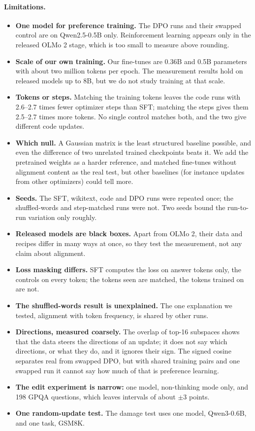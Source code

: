 \paragraph{Limitations.}
\begin{itemize}
  \item \textbf{One model for preference training.} The DPO runs and their
  swapped control are on Qwen2.5-0.5B only. Reinforcement learning appears only
  in the released OLMo 2 stage, which is too small to measure above rounding.
  \item \textbf{Scale of our own training.} Our fine-tunes are 0.36B and 0.5B
  parameters with about two million tokens per epoch. The measurement results
  hold on released models up to 8B, but we do not study training at that scale.
  \item \textbf{Tokens or steps.} Matching the training tokens leaves the
  code runs with 2.6--2.7 times fewer optimizer steps than SFT; matching the steps
  gives them 2.5--2.7 times more tokens. No single control matches both, and the
  two give different code updates.
  \item \textbf{Which null.} A Gaussian matrix is the least structured baseline
  possible, and even the difference of two unrelated trained checkpoints beats
  it. We add the pretrained weights as a harder reference, and matched
  fine-tunes without alignment content as the real test, but other baselines
  (for instance updates from other optimizers) could tell more.
  \item \textbf{Seeds.} The SFT, wikitext, code and DPO runs were repeated
  once; the shuffled-words and step-matched runs were not. Two seeds bound
  the run-to-run variation only roughly.
  \item \textbf{Released models are black boxes.} Apart from OLMo 2, their
  data and recipes differ in many ways at once, so they test the measurement,
  not any claim about alignment.
  \item \textbf{Loss masking differs.} SFT computes the loss on answer tokens
  only, the controls on every token; the tokens seen are matched, the tokens
  trained on are not.
  \item \textbf{The shuffled-words result is unexplained.} The one explanation
  we tested, alignment with token frequency, is shared by other runs.
  \item \textbf{Directions, measured coarsely.} The overlap of top-16
  subspaces shows that the data steers the directions of an update; it does
  not say which directions, or what they do, and it ignores their sign. The
  signed cosine separates real from swapped DPO, but with shared training pairs
  and one swapped run it cannot say how much of that is preference learning.
  \item \textbf{The edit experiment is narrow:} one model, non-thinking mode
  only, and 198 GPQA questions, which leaves intervals of about $\pm3$
  points.
  \item \textbf{One random-update test.} The damage test uses one model,
  Qwen3-0.6B, and one task, GSM8K.
\end{itemize}

